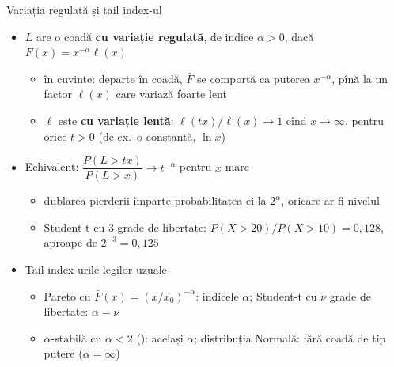 \begin{frame}{Variația regulată și tail index-ul}
\itemsize{\small}
\begin{itemize}
    \item $L$ are o coadă \textbf{cu variație regulată}, de indice $\alpha > 0$, dacă $\bar F(x) = x^{-\alpha}\ell(x)$
    \begin{itemize}
        \item în cuvinte: departe în coadă, $\bar F$ se comportă ca puterea $x^{-\alpha}$, pînă la un factor $\ell(x)$ care variază foarte lent
        \item $\ell$ este \textbf{cu variație lentă}: $\ell(tx)/\ell(x) \to 1$ cînd $x \to \infty$, pentru orice $t > 0$ (de ex.\ o constantă, $\ln x$)
    \end{itemize}
    \item Echivalent: $\dfrac{P(L > tx)}{P(L > x)} \to t^{-\alpha}$ pentru $x$ mare
    \begin{itemize}
        \item dublarea pierderii împarte probabilitatea ei la $2^\alpha$, oricare ar fi nivelul
        \item Student-t cu 3 grade de libertate: $P(X > 20)/P(X > 10) = 0{,}128$, aproape de $2^{-3} = 0{,}125$
    \end{itemize}
    \item Tail index-urile legilor uzuale
    \begin{itemize}
        \item Pareto cu $\bar F(x) = (x/x_0)^{-\alpha}$: indicele $\alpha$; Student-t cu $\nu$ grade de libertate: $\alpha = \nu$
        \item $\alpha$-stabilă cu $\alpha < 2$ (): același $\alpha$; distribuția Normală: fără coadă de tip putere ($\alpha = \infty$)
    \end{itemize}
\end{itemize}
\end{frame}

